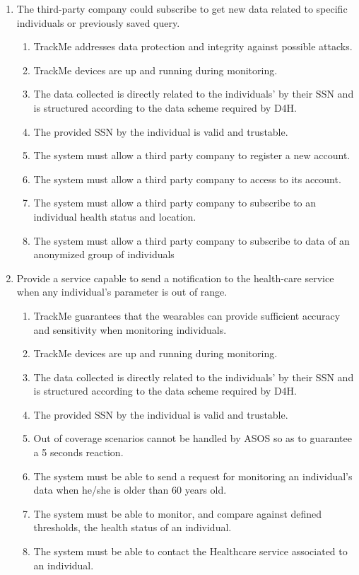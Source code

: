 \documentclass[a4paper, hidelinks, 12pt]{report}
\newcommand\requirement[1]{\item[{[R#1]}] }
\newcommand\goal[1]{\item[{[G#1]}] }
\newcommand\assumption[1]{\item[{[D#1]}] }
\begin{document}
\begin{enumerate}
		\goal{4} The third-party company could subscribe to get new data related to specific individuals or previously saved query.
		\begin{enumerate}
			\assumption{2} TrackMe addresses data protection and integrity against possible attacks.
			\assumption{3} TrackMe devices are up and running during monitoring.
			\assumption{4} The data collected is directly related to the individuals' by their SSN and is structured according to the data scheme required by D4H.
			\assumption{5} The provided SSN by the individual is valid and trustable.
			\requirement{5} The system must allow a third party company to register a new account.
			\requirement{6} The system must allow a third party company to access to its account.
			\requirement{11} The system must allow a third party company to subscribe to an individual health status and location.
			\requirement{12} The system must allow a third party company to subscribe to data of an anonymized group of individuals
		\end{enumerate}
		
		\goal{5} Provide a service capable to send a notification to the health-care service when any individual's parameter is out of range.
		\begin{enumerate}
			\assumption{1} TrackMe guarantees that the wearables can provide sufficient accuracy and sensitivity when monitoring individuals.
			\assumption{3} TrackMe devices are up and running during monitoring.
			\assumption{4} The data collected is directly related to the individuals' by their SSN and is structured according to the data scheme required by D4H.
			\assumption{5} The provided SSN by the individual is valid and trustable.
			\assumption{6} Out of coverage scenarios cannot be handled by ASOS so as to guarantee a 5 seconds reaction.
			\requirement{13} The system must be able to send a request for monitoring an individual's data when he/she is older than 60 years old.
			\requirement{14} The system must be able to monitor, and compare against defined thresholds, the health status of an individual.
			\requirement{15} The system must be able to contact the Healthcare service associated to an individual.
		\end{enumerate}
		

\end{enumerate}
\end{document}
